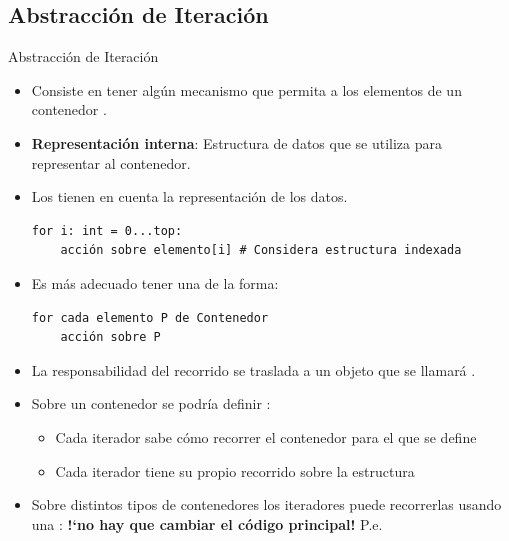 \documentclass[10pt,envcountsect,spanish]{beamer}
\begin{document}
\subsection{Abstracción de Iteración}
\begin{frame}[fragile]{Abstracción de Iteración}
\begin{itemize}%
\item Consiste en tener algún mecanismo que permita  a los elementos de un contenedor .

\item \textbf{Representación interna}: Estructura de datos que se utiliza para representar al contenedor.

\item Los  tienen en cuenta la representación de los datos.
\begin{Verbatim}[frame=single, fontsize=\footnotesize]
for i: int = 0...top:
    acción sobre elemento[i] # Considera estructura indexada
\end{Verbatim}

\item Es más adecuado tener una  de la forma:

\begin{Verbatim}[frame=single, fontsize=\footnotesize]
for cada elemento P de Contenedor
    acción sobre P
\end{Verbatim}

\item La responsabilidad del recorrido se traslada a un objeto que se llamará .

\item Sobre un contenedor se podría definir :

\begin{itemize}
\item
Cada iterador sabe cómo recorrer el contenedor para el que se define 

\item
Cada iterador tiene su propio recorrido sobre la estructura
\end{itemize}

\item Sobre distintos tipos de contenedores los iteradores puede recorrerlas usando una :\textbf{ !`no hay que cambiar el código principal! }P.e. 
\end{itemize}
\end{frame}
\end{document}
